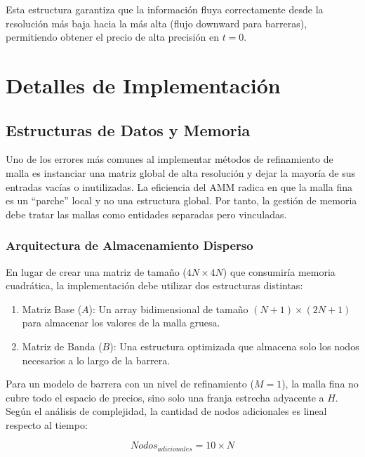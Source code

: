 Esta estructura garantiza que la información fluya correctamente desde la resolución más baja hacia la más alta (flujo downward para barreras), permitiendo obtener el precio de alta precisión en $t=0$.

\section{Detalles de Implementación}
\label{sec:detalles_impl_arboles}

\subsection{Estructuras de Datos y Memoria}
\label{sec:data_structures}

Uno de los errores más comunes al implementar métodos de refinamiento de malla es instanciar una matriz global de alta resolución y dejar la mayoría de sus entradas vacías o inutilizadas. La eficiencia del AMM radica en que la malla fina es un ``parche'' local y no una estructura global. Por tanto, la gestión de memoria debe tratar las mallas como entidades separadas pero vinculadas.

\subsubsection{Arquitectura de Almacenamiento Disperso} 

En lugar de crear una matriz de tamaño ($4N\times 4N$) que consumiría memoria cuadrática, la implementación debe utilizar dos estructuras distintas:

\begin{enumerate} 
  \item Matriz Base ($A$): Un array bidimensional de tamaño $(N+1)\times(2N+1)$ para almacenar los valores de la malla gruesa.
  
  \item Matriz de Banda ($B$): Una estructura optimizada que almacena solo los nodos necesarios a lo largo de la barrera.
\end{enumerate}

Para un modelo de barrera con un nivel de refinamiento ($M=1$), la malla fina no cubre todo el espacio de precios, sino solo una franja estrecha adyacente a $H$. Según el análisis de complejidad, la cantidad de nodos adicionales es lineal respecto al tiempo: 

\begin{equation} 
  Nodos_{adicionales} = 10 \times N 
\end{equation} 

